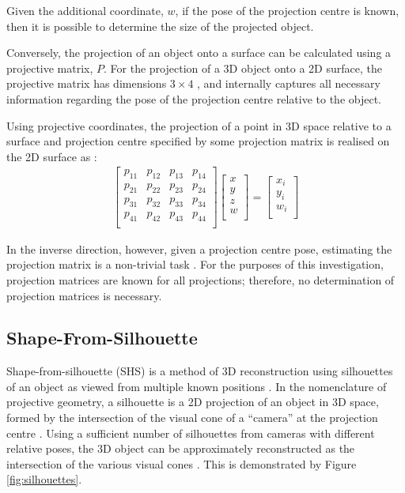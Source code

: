 Given the additional coordinate, $w$, if the pose of the projection centre is known, then it is possible to determine the size of the projected object.

Conversely, the projection of an object onto a surface can be calculated using a projective matrix, $P$. For the projection of a 3D object onto a 2D surface, the projective matrix has dimensions $3\times4$ \cite{lovell_2023b}, and internally captures all necessary information regarding the pose of the projection centre relative to the object.

Using projective coordinates, the projection of a point in 3D space relative to a surface and projection centre specified by some projection matrix is realised on the 2D surface as \cite{lovell_2023b}:
\begin{align} \label{eqn:projn}
  \begin{bmatrix}
    p_{11} & p_{12} & p_{13} & p_{14} \\
    p_{21} & p_{22} & p_{23} & p_{24} \\
    p_{31} & p_{32} & p_{33} & p_{34} \\
    p_{41} & p_{42} & p_{43} & p_{44} \\
  \end{bmatrix}
  \begin{bmatrix}
    x \\
    y \\
    z \\
    w \\
  \end{bmatrix}
  =
  \begin{bmatrix}
    x_i \\
    y_i \\
    w_i \\
  \end{bmatrix}
\end{align}

In the inverse direction, however, given a projection centre pose, estimating the projection matrix is a non-trivial task \cite{lovell_2023b}. For the purposes of this investigation, projection matrices are known for all projections; therefore, no determination of projection matrices is necessary.

\newpage
\subsection{Shape-From-Silhouette}

Shape-from-silhouette (SHS) is a method of 3D reconstruction using silhouettes of an object as viewed from multiple known positions \cite{lovell_2023b}. In the nomenclature of projective geometry, a silhouette is a 2D projection of an object in 3D space, formed by the intersection of the visual cone of a ``camera'' at the projection centre \cite{cheung_2005}. Using a sufficient number of silhouettes from cameras with different relative poses, the 3D object can be approximately reconstructed as the intersection of the various visual cones \cite{lovell_2023b}. This is demonstrated by Figure \ref{fig:silhouettes}.


